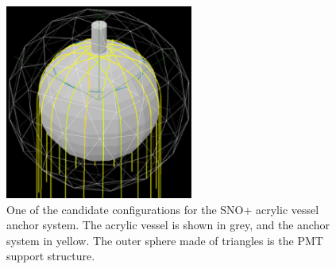 \begin{figure}[t!b!]
\begin{center}
\includegraphics[width=0.55\textwidth]{img/Snoplus_anchor_possibility.eps}
\end{center}
\caption{\label{fig:snoplus_anchor_possibility}One of the candidate configurations for the SNO+ acrylic vessel anchor system. The acrylic vessel is shown in grey, and the anchor system in yellow. The outer sphere made of triangles is the PMT support structure.} 
\end{figure}
